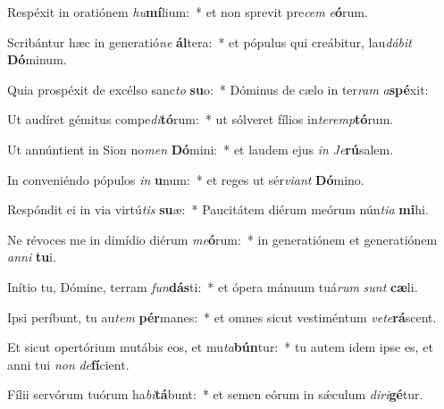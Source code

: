 \item Respéxit in oratiónem \textit{hu}\textbf{mí}lium:~* et non sprevit pre\textit{cem} \textit{e}\textbf{ó}rum.
\item Scribántur hæc in generatió\textit{ne} \textbf{ál}tera:~* et pópulus qui creábitur, lau\textit{dá}\textit{bit} \textbf{Dó}minum.
\item Quia prospéxit de excélso sanc\textit{to} \textbf{su}o:~* Dóminus de cælo in ter\textit{ram} \textit{a}\textbf{spé}xit:
\item Ut audíret gémitus compe\textit{di}\textbf{tó}rum:~* ut sólveret fílios in\textit{ter}\textit{emp}\textbf{tó}rum.
\item Ut annúntient in Sion no\textit{men} \textbf{Dó}mini:~* et laudem ejus \textit{in} \textit{Je}\textbf{rú}salem.
\item In conveniéndo pópulos \textit{in} \textbf{u}num:~* et reges ut sér\textit{vi}\textit{ant} \textbf{Dó}mino.
\item Respóndit ei in via virtú\textit{tis} \textbf{su}æ:~* Paucitátem diérum meórum nún\textit{ti}\textit{a} \textbf{mi}hi.
\item Ne révoces me in dimídio diérum \textit{me}\textbf{ó}rum:~* in generatiónem et generatiónem \textit{an}\textit{ni} \textbf{tu}i.
\item Inítio tu, Dómine, terram \textit{fun}\textbf{dás}ti:~* et ópera mánuum tuá\textit{rum} \textit{sunt} \textbf{cæ}li.
\item Ipsi períbunt, tu au\textit{tem} \textbf{pér}manes:~* et omnes sicut vestiméntum \textit{ve}\textit{te}\textbf{rá}scent.
\item Et sicut opertórium mutábis eos, et mu\textit{ta}\textbf{bún}tur:~* tu autem idem ipse es, et anni tui \textit{non} \textit{de}\textbf{fí}cient.
\item Fílii servórum tuórum ha\textit{bi}\textbf{tá}bunt:~* et semen eórum in sǽculum \textit{di}\textit{ri}\textbf{gé}tur.
